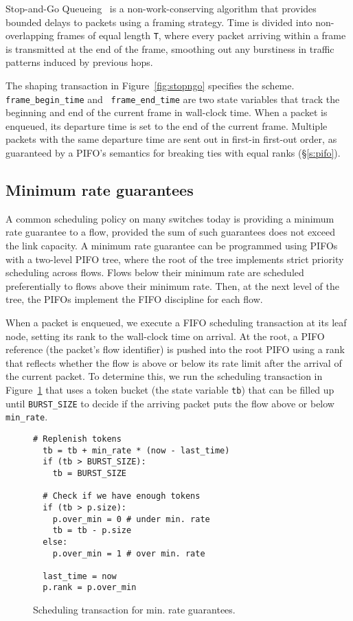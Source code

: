 Stop-and-Go Queueing~\cite{stopngo} is a non-work-conserving algorithm
that provides bounded delays to packets using a framing strategy. Time
is divided into non-overlapping frames of equal length \texttt{T}, where
every packet arriving within a frame is transmitted at the end of the
frame, smoothing out any burstiness in traffic patterns induced by
previous hops.

The shaping transaction in Figure~\ref{fig:stopngo}
specifies the scheme. {\tt frame\_begin\_time} and {\tt
  frame\_end\_time} are two state variables that track the beginning
and end of the current frame in wall-clock time.  When a packet is
enqueued, its departure time is set to the end of the current frame.
Multiple packets with the same departure time are sent out in first-in
first-out order, as guaranteed by a PIFO's semantics for breaking ties
with equal ranks (\S\ref{s:pifo}).

\subsection{Minimum rate guarantees}
\label{ss:min_rate}

A common scheduling policy on many switches today is providing a
minimum rate guarantee to a flow, provided the sum of such guarantees
does not exceed the link capacity. A minimum rate guarantee can be
programmed using PIFOs with a two-level PIFO tree, where the root of
the tree implements strict priority scheduling across flows. Flows
below their minimum rate are scheduled preferentially to flows above
their minimum rate. Then, at the next level of the tree, the PIFOs
implement the FIFO discipline for each flow.

When a packet is enqueued, we execute a FIFO scheduling transaction at
its leaf node, setting its rank to the wall-clock time on arrival. At
the root, a PIFO reference (the packet's flow identifier) is pushed
into the root PIFO using a rank that reflects whether the flow is
above or below its rate limit after the arrival of the current
packet. To determine this, we run the scheduling transaction in
Figure~\ref{fig:min_rate} that uses a token bucket (the state variable
{\tt tb}) that can be filled up until {\tt BURST\_SIZE} to decide if
the arriving packet puts the flow above or below {\tt min\_rate}.

\begin{figure}
  \begin{lstlisting}[style=customc]
  # Replenish tokens
  tb = tb + min_rate * (now - last_time)
  if (tb > BURST_SIZE):
    tb = BURST_SIZE

  # Check if we have enough tokens
  if (tb > p.size):
    p.over_min = 0 # under min. rate
    tb = tb - p.size
  else:
    p.over_min = 1 # over min. rate

  last_time = now
  p.rank = p.over_min
  \end{lstlisting}
\caption{Scheduling transaction for min. rate guarantees.}
\label{fig:min_rate}
\end{figure}

